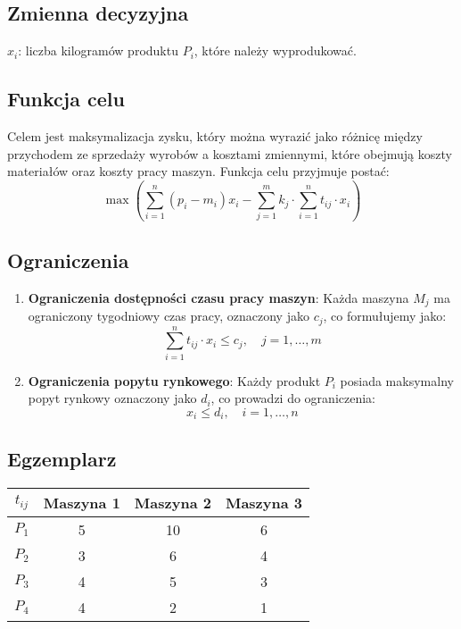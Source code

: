 \documentclass[12pt, letterpaper]{article}
\begin{document}
\subsection{Zmienna decyzyjna}

\( x_i \): liczba kilogramów produktu \( P_i \), które
należy
wyprodukować.

\subsection{Funkcja celu}
Celem jest maksymalizacja zysku, który można wyrazić jako różnicę między
przychodem ze sprzedaży wyrobów a kosztami zmiennymi, które obejmują koszty
materiałów oraz koszty pracy maszyn. Funkcja celu przyjmuje postać:
\[
  \max \left( \sum_{i=1}^n \left( p_i - m_i \right) x_i - \sum_{j=1}^m k_j
  \cdot \sum_{i=1}^n t_{ij} \cdot x_i \right)
\]

\subsection{Ograniczenia}

\begin{enumerate}
  \item \textbf{Ograniczenia dostępności czasu pracy maszyn}: Każda maszyna \(
        M_j \) ma ograniczony tygodniowy czas pracy, oznaczony jako \( c_j \),
        co
        formułujemy jako:
        \[
          \sum_{i=1}^n t_{ij} \cdot x_i \leq c_j, \quad j = 1, \dots, m
        \]

  \item \textbf{Ograniczenia popytu rynkowego}: Każdy produkt \( P_i \) posiada
        maksymalny popyt rynkowy oznaczony jako \( d_i \), co prowadzi do
        ograniczenia:
        \[
          x_i \leq d_i, \quad i = 1, \dots, n
        \]

\end{enumerate}

\subsection{Egzemplarz}

\begin{center}
  \begin{tabular}{|c|c|c|c|}
    \hline
    \( t_{ij} \) & Maszyna 1 & Maszyna 2 & Maszyna 3 \\
    \hline
    \( P_1 \)    & 5         & 10        & 6         \\
    \( P_2 \)    & 3         & 6         & 4         \\
    \( P_3 \)    & 4         & 5         & 3         \\
    \( P_4 \)    & 4         & 2         & 1         \\
    \hline
  \end{tabular}
\end{center}
\end{document}
